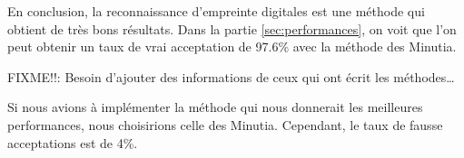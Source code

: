 En conclusion, la reconnaissance d'empreinte digitales est une méthode
qui obtient de très bons résultats. Dans la partie
\ref{sec:performances}, on voit que l'on peut obtenir un taux de vrai
acceptation de 97.6\% avec la méthode des Minutia.

FIXME!!: Besoin d'ajouter des informations de ceux qui ont écrit les
méthodes\ldots

Si nous avions à implémenter la méthode qui nous donnerait les
meilleures performances, nous choisirions celle des
Minutia. Cependant, le taux de fausse acceptations est de 4\%.



